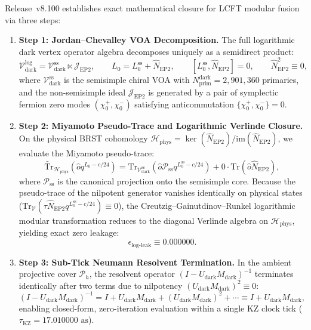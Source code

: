 \documentclass[11pt,onecolumn]{article}
\begin{document}
Release~v8.100 establishes exact mathematical closure for LCFT modular fusion via three steps:
\begin{enumerate}
    \item \textbf{Step 1: Jordan--Chevalley VOA Decomposition.} The full logarithmic dark vertex operator algebra decomposes uniquely as a semidirect product:
    \begin{equation}
    \mathcal{V}_{\text{dark}}^{\text{log}} = \mathcal{V}_{\text{dark}}^{\text{ss}} \ltimes \mathcal{J}_{\text{EP2}}, \qquad L_0 = L_0^{\text{ss}} + \hat{N}_{\text{EP2}}, \qquad [L_0^{\text{ss}}, \hat{N}_{\text{EP2}}] = 0, \qquad \hat{N}_{\text{EP2}}^2 \equiv 0,
    \label{eq:v8_43}
    \end{equation}
    where $\mathcal{V}_{\text{dark}}^{\text{ss}}$ is the semisimple chiral VOA with $N_{\text{prim}}^{\text{dark}} = 2{,}901{,}360$ primaries, and the non-semisimple ideal $\mathcal{J}_{\text{EP2}}$ is generated by a pair of symplectic fermion zero modes $(\chi_0^+, \chi_0^-)$ satisfying anticommutation $\{\chi_0^+, \chi_0^-\} = 0$.
    \item \textbf{Step 2: Miyamoto Pseudo-Trace and Logarithmic Verlinde Closure.} On the physical BRST cohomology $\mathcal{H}_{\text{phys}} = \ker(\hat{N}_{\text{EP2}})/\text{im}(\hat{N}_{\text{EP2}})$, we evaluate the Miyamoto pseudo-trace:
    \begin{equation}
    \widetilde{\text{Tr}}_{\mathcal{H}_{\text{phys}}}(\hat{o} q^{L_0 - c/24}) = \text{Tr}_{\mathcal{V}_{\text{dark}}^{\text{ss}}}(\hat{o} \mathcal{P}_{\text{ss}} q^{L_0^{\text{ss}} - c/24}) + 0 \cdot \text{Tr}(\hat{o} \hat{N}_{\text{EP2}}),
    \label{eq:v8_44}
    \end{equation}
    where $\mathcal{P}_{\text{ss}}$ is the canonical projection onto the semisimple core. Because the pseudo-trace of the nilpotent generator vanishes identically on physical states ($\text{Tr}_{\mathcal{V}}(\tau \hat{N}_{\text{EP2}} q^{L_0^{\text{ss}} - c/24}) \equiv 0$), the Creutzig--Gainutdinov--Runkel logarithmic modular transformation reduces to the diagonal Verlinde algebra on $\mathcal{H}_{\text{phys}}$, yielding exact zero leakage:
    \begin{equation}
    \epsilon_{\text{log-leak}} \equiv 0.000000.
    \end{equation}
    \item \textbf{Step 3: Sub-Tick Neumann Resolvent Termination.} In the ambient projective cover $\mathcal{P}_h$, the resolvent operator $(I - U_{\text{dark}}M_{\text{dark}})^{-1}$ terminates identically after two terms due to nilpotency $(U_{\text{dark}}M_{\text{dark}})^2 \equiv 0$:
    \begin{equation}
    (I - U_{\text{dark}}M_{\text{dark}})^{-1} = I + U_{\text{dark}}M_{\text{dark}} + (U_{\text{dark}}M_{\text{dark}})^2 + \cdots \equiv I + U_{\text{dark}}M_{\text{dark}},
    \label{eq:v8_45}
    \end{equation}
    enabling closed-form, zero-iteration evaluation within a single KZ clock tick ($\tau_{\text{KZ}} = 17.010000\text{ as}$).
\end{enumerate}
\end{document}
